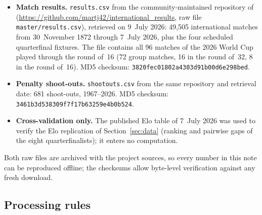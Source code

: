 \begin{itemize}
  \item \textbf{Match results.} \texttt{results.csv} from the
        community-maintained repository of \cite{martj42results}
        (\url{https://github.com/martj42/international_results}, raw file
        \texttt{master/results.csv}), retrieved on 9~July 2026:
        49{,}505 international matches from 30~November 1872 through
        7~July 2026, plus the four scheduled quarterfinal fixtures. The file
        contains all 96 matches of the 2026 World Cup played through the
        round of~16 (72 group matches, 16 in the round of~32, 8 in the round
        of~16). MD5 checksum:
        \texttt{3820fec01802a4303d91b00d6e298bed}.
  \item \textbf{Penalty shoot-outs.} \texttt{shootouts.csv} from the same
        repository and retrieval date: 681 shoot-outs, 1967--2026. MD5
        checksum: \texttt{3461b3d538309f7f17b63259e4b0b524}.
  \item \textbf{Cross-validation only.} The published Elo table of 7~July
        2026 \cite{eloratings} was used to verify the Elo replication of
        Section~\ref{sec:data} (ranking and pairwise gaps of the eight
        quarterfinalists); it enters no computation.
\end{itemize}
Both raw files are archived with the project sources, so every number in
this note can be reproduced offline; the checksums allow byte-level
verification against any fresh download.

\subsection{Processing rules}
\label{app:processing}

